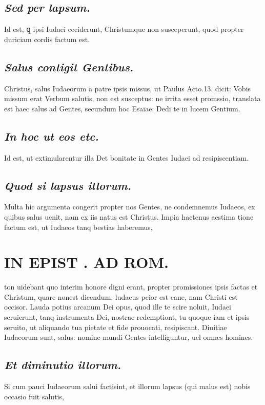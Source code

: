 \documentclass{article}
\begin{document}
\begin{pages}
\subsection*{\textit{Sed per lapsum. }}\pstart Id est, ꝗ ipsi Iudaei ceciderunt, Christumque non susceperunt, quod propter duriciam cordis factum est.  \pend
{}
{}
\subsection*{\textit{Salus contigit Gentibus. }}\pstart Christus, salus Iudaeorum a patre ipsis missus, ut Paulus Acto.13. dicit: Vobis missum erat Verbum salutis, non est susceptus: ne irrita esset promssio, translata est haec salus ad Gentes, secundum hoc Esaiae: Dedi te in lucem Gentium.  \pend
{}
{}
\subsection*{\textit{In hoc ut eos etc. }}\pstart Id est, ut extimularentur illa Det bonitate in Gentes Iudaei ad resipiscentiam.   \pend
{}
{}
\subsection*{\textit{Quod si lapsus illorum. }}\pstart Multa hic argumenta congerit propter nos Gentes, ne condemnemus Iudaeos, ex quibus salus uenit, nam ex iis natus est Christus. Impia hactenus aestima tione factum est, ut Iudaeos tanq bestias haberemus,  \pend
\section*{IN EPIST . AD ROM.  }
\marginpar{[ p.n0 ]}\pstart ton uidebant quo interim honore digni erant, propter promissiones ipsis factas et Christum, quare nonest dicendum, ludaeus peior est cane, nam Christi est occisor. Lauda potius arcanum Dei opus, quod ille te scire noluit, Iudaei seruierunt, tanq instrumenta Dei, nostrae redemptiont, tu quoque iam et ipsis seruito, ut aliquando tua pietate et fide prouocati, resipiscant.  Diuitiae Iudaeorum sunt, salus: nomine mundi Gentes intelliguntur, uel omnes homines.  \pend
{}
{}
\subsection*{\textit{Et diminutio illorum. }}\pstart Si cum pauci Iudaeorum salui factisint, et illorum lapsus (qui malus est) nobis occasio fuit salutis,  \pend
{}
{}

\end{pages}
\end{document}
